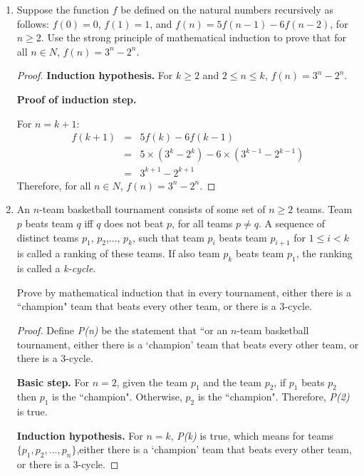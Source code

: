 \documentclass[12pt,a4paper]{article}
\theoremstyle{definition}
\begin{document}
\begin{enumerate}
\begin{proof}
\end{proof}

    \item
    Suppose the function $f$ be defined on the natural numbers recursively as follows: $f(0)=0$, $f(1)=1$, and $f(n)=5f(n-1)-6f(n-2)$, for $n\geq 2$. Use the strong principle of mathematical induction to prove that for all $n\in N$, $f(n)=3^n-2^n$. 
   
\begin{proof}

\textbf{Induction  hypothesis.} For $k\geq2$ and $2\leq n\leq k$, $f(n)=3^n-2^n$.

\textbf{Proof of induction step.}

For $n=k+1$:
\begin{eqnarray}
f(k+1) &=& 5f(k)-6f(k-1) \nonumber \\ 
~&=& 5\times(3^k-2^k) - 6\times(3^{k-1}-2^{k-1})\nonumber \\ 
~&=& 3^{k+1}-2^{k+1} \nonumber
\end{eqnarray}
Therefore, for all $n\in \textit{N}$, $f(n)=3^n-2^n$.
\end{proof}

    \item
    An $n$-team basketball tournament consists of some set of $n\geq2$ teams. Team $p$ beats team $q$ iff $q$
does not beat $p$, for all teams $p\neq q$. A sequence of distinct teams $p_{1}$, $p_{2}$,..., $p_{k}$, such that team $p_{i}$ beats team $p_{i+1}$ for $1\leq i<k$ is called a ranking of these teams. If also team $p_{k}$ beats team $p_{1}$, the ranking is called a \emph{k-cycle}. 

Prove by mathematical induction that in every tournament, either there is a ``champion" team that beats every other team, or there is a 3-cycle. 

 \begin{proof}
 Define \textit{P(n)} be the statement that ``or an $n$-team basketball tournament, either there is a `champion' team that beats every other team, or there is a 3-cycle. 
 
\textbf{Basic step.} For $n=2$, given the team $p_1$ and the team $p_2$, if $p_1$ beats $p_2$ then $p_1$ is the ``champion". Otherwise, $p_2$ is the ``champion". Therefore, \textit{P(2)} is true.

\textbf{Induction hypothesis.} For $n=k$, \textit{P(k)} is true, which means for teams $\{p_1, p_2,...,p_n\}$,either there is a `champion' team that beats every other team, or there is a 3-cycle.


\end{proof}
\end{enumerate}
\end{document}

